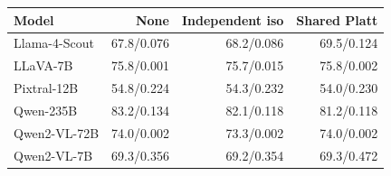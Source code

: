 \begin{tabular}{lrrr}
\toprule
Model & None & Independent iso & Shared Platt \\
\midrule
Llama-4-Scout & 67.8/0.076 & 68.2/0.086 & 69.5/0.124 \\
LLaVA-7B & 75.8/0.001 & 75.7/0.015 & 75.8/0.002 \\
Pixtral-12B & 54.8/0.224 & 54.3/0.232 & 54.0/0.230 \\
Qwen-235B & 83.2/0.134 & 82.1/0.118 & 81.2/0.118 \\
Qwen2-VL-72B & 74.0/0.002 & 73.3/0.002 & 74.0/0.002 \\
Qwen2-VL-7B & 69.3/0.356 & 69.2/0.354 & 69.3/0.472 \\
\bottomrule
\end{tabular}
